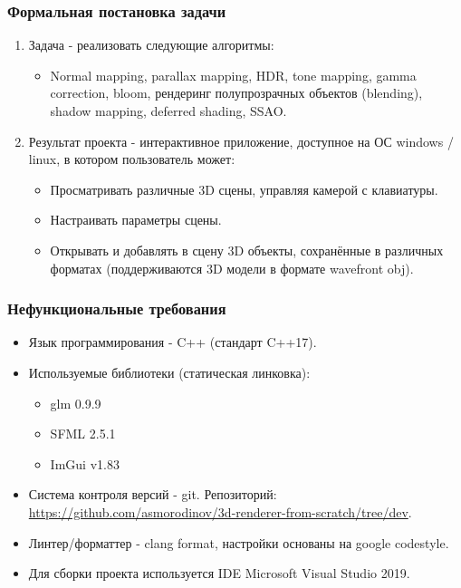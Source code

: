 \documentclass{beamer}
\begin{document}
	\begin{frame}
		\frametitle{Формальная постановка задачи}

		\begin{enumerate}
			\item<1-> Задача - реализовать следующие алгоритмы:
			\begin{itemize}
				\item<1-> Normal mapping, parallax mapping, HDR, tone mapping, gamma correction, bloom, рендеринг полупрозрачных объектов (blending), shadow mapping, deferred shading, SSAO. 
			\end{itemize}
			\item<2-> Результат проекта - интерактивное приложение, доступное на ОС windows / linux, в котором пользователь может:
			\begin{itemize}
				\item<2-> Просматривать различные 3D сцены, управляя камерой с клавиатуры.
				\item<2-> Настраивать параметры сцены.
				\item<2-> Открывать и добавлять в сцену 3D объекты, сохранённые в различных форматах (поддерживаются 3D модели в формате wavefront obj).
			\end{itemize}
		\end{enumerate}
	\end{frame}
	
	\begin{frame}
		\frametitle{Нефункциональные требования}
	
		\begin{itemize}
			\item<1-> Язык программирования - C++ (стандарт C++17).
			\item<1-> Используемые библиотеки (статическая линковка):
			\begin{itemize}
				\item<1-> glm 0.9.9
				\item<1-> SFML 2.5.1
				\item<1-> ImGui v1.83
			\end{itemize}
			\item<1-> Система контроля версий - git. Репозиторий: \\ {\scriptsize \url{https://github.com/asmorodinov/3d-renderer-from-scratch/tree/dev}}.
			\item<1-> Линтер/форматтер - clang format, настройки основаны на google codestyle.
			\item<1-> Для сборки проекта используется IDE Microsoft Visual Studio 2019.
		\end{itemize}
	\end{frame}
	
\end{document}
